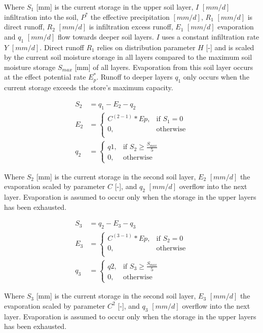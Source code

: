 Where $S_1$ [mm] is the current storage in the upper soil layer, $I$ $[mm/d]$ infiltration into the soil, $P^*$ the effective precipitation $[mm/d]$, $R_1$ $[mm/d]$ is direct runoff, $R_2$ $[mm/d]$ is infiltration excess runoff, $E_1$ $[mm/d]$ evaporation and $q_1$ $[mm/d]$ flow towards deeper soil layers. $I$ uses a constant infiltration rate $Y$ $[mm/d]$. Direct runoff $R_1$ relies on distribution parameter $H$ [-] and is scaled by the current soil moisture storage in all layers compared to the maximum soil moisture storage $S_{max}$ [mm] of all layers. Evaporation from this soil layer occurs at the effect potential rate $E_p^*$. Runoff to deeper layers $q_1$ only occurs when the current storage exceeds the store's maximum capacity. 

\begin{align}
	S_2 &= q_1 - E_2 - q_2\\
	E_2 &= 
		\begin{cases}
		C^{(2-1)}*Ep , & \text{if } S_1 = 0\\
		0, & \text{otherwise}\\
	\end{cases}\\
	q_2 &= 
	\begin{cases}
		q1, & \text{if } S_2 \geq \frac{S_{max}}{5} \\
		0, & \text{otherwise}
	\end{cases}
\end{align}

Where $S_2$ [mm] is the current storage in the second soil layer, $E_2$ $[mm/d]$ the evaporation scaled by parameter $C$ [-], and $q_2$ $[mm/d]$ overflow into the next layer. Evaporation is assumed to occur only when the storage in the upper layers has been exhausted.

\begin{align}
	S_3 &= q_2 - E_3 - q_3\\
	E_3 &= 
		\begin{cases}
		C^{(3-1)}*Ep , & \text{if } S_2 = 0\\
		0, & \text{otherwise}\\
	\end{cases}\\
	q_3 &= 
	\begin{cases}
		q2, & \text{if } S_3 \geq \frac{S_{max}}{5} \\
		0, & \text{otherwise}
	\end{cases}
\end{align}

Where $S_3$ [mm] is the current storage in the second soil layer, $E_3$ $[mm/d]$ the evaporation scaled by parameter $C^2$ [-], and $q_3$ $[mm/d]$ overflow into the next layer. Evaporation is assumed to occur only when the storage in the upper layers has been exhausted.

